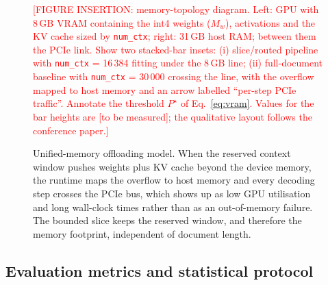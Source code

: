 \documentclass[pdflatex,sn-mathphys-num]{sn-jnl}
\newcommand{\todo}[1]{\textcolor{red}{#1}}
\theoremstyle{thmstyleone}%
\theoremstyle{thmstylethree}%
\begin{document}
\begin{figure}[htbp]
  \centering
  \todo{[FIGURE INSERTION: memory-topology diagram. Left: GPU with 8\,GB VRAM containing the int4 weights ($M_w$), activations and the KV cache sized by \texttt{num\_ctx}; right: 31\,GB host RAM; between them the PCIe link. Show two stacked-bar insets: (i) slice/routed pipeline with \texttt{num\_ctx} = 16\,384 fitting under the 8\,GB line; (ii) full-document baseline with \texttt{num\_ctx} = 30\,000 crossing the line, with the overflow mapped to host memory and an arrow labelled ``per-step PCIe traffic''. Annotate the threshold $P^{\star}$ of Eq.~\eqref{eq:vram}. Values for the bar heights are \todo{[to be measured]}; the qualitative layout follows the conference paper.]}
  \caption{Unified-memory offloading model. When the reserved context window pushes weights plus KV cache beyond the device memory, the runtime maps the overflow to host memory and every decoding step crosses the PCIe bus, which shows up as low GPU utilisation and long wall-clock times rather than as an out-of-memory failure. The bounded slice keeps the reserved window, and therefore the memory footprint, independent of document length.}
  \label{fig:memory}
\end{figure}

\subsection{Evaluation metrics and statistical protocol}\label{sec:metrics}
\end{document}
